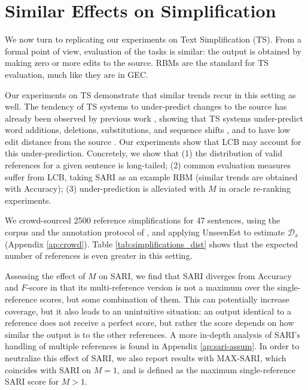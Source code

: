 \documentclass[a4paper]{article}
\begin{document}
\section{Similar Effects on Simplification}\label{sec:simplification}

We now turn to replicating our experiments on Text Simplification (TS). 
From a formal point of view, evaluation of the tasks is similar:
the output is obtained by making zero or more edits to the source. RBMs are the standard for TS evaluation,
much like they are in GEC.

Our experiments on TS demonstrate that similar trends recur in this setting as well. 
The tendency of TS systems to under-predict changes to the source 
has already been observed by previous work \cite{alvamanchego-EtAl:2017:I17-1}, 
showing that TS systems under-predict word additions, deletions,
substitutions, and sequence shifts \cite{zhang-lapata:2017:EMNLP2017},
and to have low edit distance from the source \cite{narayan-gardent:2016:INLG}.
Our experiments show that LCB may account for this under-prediction. Concretely, we show that
(1) the distribution of valid references for a given sentence is long-tailed; 
(2) common evaluation measures suffer from LCB, taking SARI \cite{Xu-EtAl:2016:TACL} 
    as an example RBM (similar trends are obtained with Accuracy); 
(3) under-prediction is alleviated with $M$ in oracle re-ranking experiments.

We crowd-sourced 2500 reference simplifications for 47 sentences, using the corpus and the annotation protocol of 
, and applying {\sc UnseenEst} to estimate $\mathcal{D}_x$ (Appendix  \ref{ap:crowd}).
Table \ref{tab:simplifications_dist} shows that the expected number of references is even greater in this setting. 

Assessing the effect of $M$ on SARI, we find that SARI diverges from Accuracy and $F$-score
in that its multi-reference version is not a maximum over the single-reference scores, but some combination of them.
This can potentially increase coverage, but it also leads to an unintuitive situation: an output 
identical to a reference does not receive a perfect score, but rather the score depends on how similar the output is to the other
references. A more in-depth analysis of SARI's handling of multiple references is found in Appendix \ref{ap:sari-assum}.
In order to neutralize this effect of SARI, we also report results with MAX-SARI, which coincides with SARI on $M=1$, 
and is defined as the maximum single-reference SARI score for $M>1$.
\end{document}
